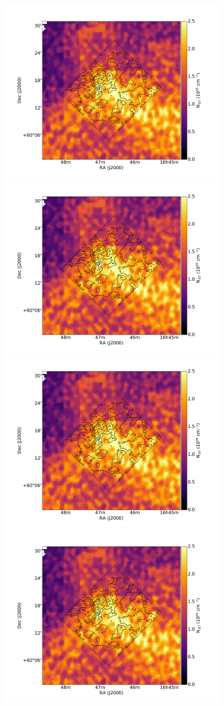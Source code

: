 \documentclass[traditabstract]{aa}
\begin{document}
\begin{figure}[h!]
  \centering
  \includegraphics[page=1,width=0.48\linewidth,trim=65 30 125 75,clip=true]{Figures/HI-CO.pdf}
  \hspace{3mm}
  \includegraphics[page=2,width=0.48\linewidth,trim=65 30 125 75,clip=true]{Figures/HI-CO.pdf} \\
  \includegraphics[page=3,width=0.48\linewidth,trim=65 30 125 75,clip=true]{Figures/HI-CO.pdf}
  \hspace{3mm}
  \includegraphics[page=4,width=0.48\linewidth,trim=65 30 125 75,clip=true]{Figures/HI-CO.pdf} \\

\end{figure}
\end{document}
